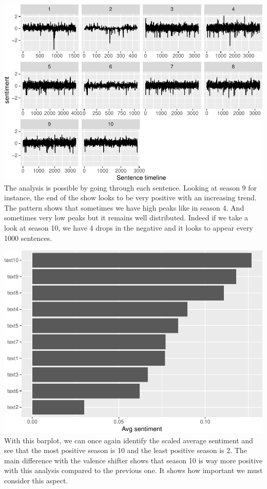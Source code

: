 \documentclass[
]{article}
\begin{document}
\includegraphics{report_files/figure-latex/unnamed-chunk-46-1.pdf} The
analysis is possible by going through each sentence. Looking at season 9
for instance, the end of the show looks to be very positive with an
increasing trend. The pattern shows that sometimes we have high peaks
like in season 4. And sometimes very low peaks but it remains well
distributed. Indeed if we take a look at season 10, we have 4 drops in
the negative and it looks to appear every 1000 sentences.

\includegraphics{report_files/figure-latex/unnamed-chunk-48-1.pdf} With
this barplot, we can once again identify the scaled average sentiment
and see that the most positive season is 10 and the least positive
season is 2. The main difference with the valence shifter shows that
season 10 is way more positive with this analysis compared to the
previous one. It shows how important we must consider this aspect.
\end{document}
